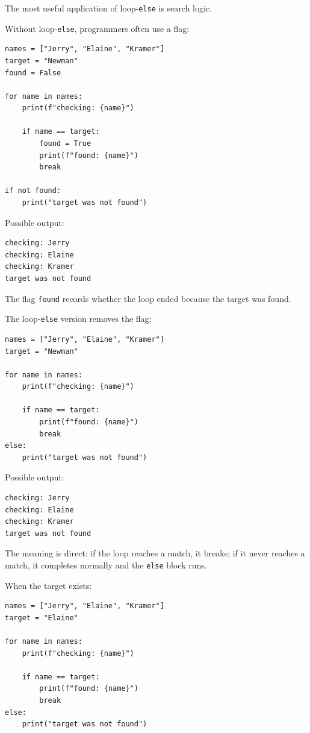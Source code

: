 The most useful application of loop-\texttt{else} is search logic.

Without loop-\texttt{else}, programmers often use a flag:

\begin{verbatim}
names = ["Jerry", "Elaine", "Kramer"]
target = "Newman"
found = False

for name in names:
    print(f"checking: {name}")

    if name == target:
        found = True
        print(f"found: {name}")
        break

if not found:
    print("target was not found")
\end{verbatim}

Possible output:

\begin{verbatim}
checking: Jerry
checking: Elaine
checking: Kramer
target was not found
\end{verbatim}

The flag \texttt{found} records whether the loop ended because the target was found.

The loop-\texttt{else} version removes the flag:

\begin{verbatim}
names = ["Jerry", "Elaine", "Kramer"]
target = "Newman"

for name in names:
    print(f"checking: {name}")

    if name == target:
        print(f"found: {name}")
        break
else:
    print("target was not found")
\end{verbatim}

Possible output:

\begin{verbatim}
checking: Jerry
checking: Elaine
checking: Kramer
target was not found
\end{verbatim}

The meaning is direct: if the loop reaches a match, it breaks; if it never reaches a match, it completes normally and the \texttt{else} block runs.

When the target exists:

\begin{verbatim}
names = ["Jerry", "Elaine", "Kramer"]
target = "Elaine"

for name in names:
    print(f"checking: {name}")

    if name == target:
        print(f"found: {name}")
        break
else:
    print("target was not found")
\end{verbatim}

